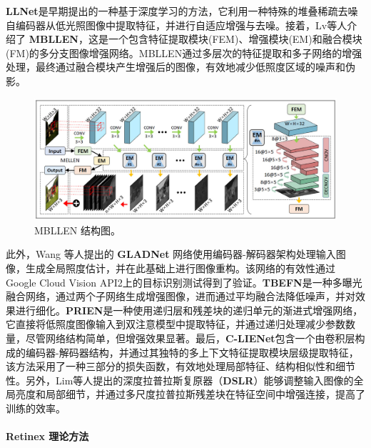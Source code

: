\documentclass[a4paper, 10pt]{article}
\begin{document}
	\textbf{LLNet}\cite{lore2017llnet}是早期提出的一种基于深度学习的方法，它利用一种特殊的堆叠稀疏去噪自编码器从低光照图像中提取特征，并进行自适应增强与去噪。接着，Lv等人\cite{lv2018mbllen}介绍了 \textbf{MBLLEN}，这是一个包含特征提取模块(FEM)、增强模块(EM)和融合模块(FM)的多分支图像增强网络。MBLLEN通过多层次的特征提取和多子网络的增强处理，最终通过融合模块产生增强后的图像，有效地减少低照度区域的噪声和伪影。
	
	\begin{figure}[htb]
		\centering 
		\includegraphics[width=\columnwidth]{picture/LLIE/MBLLEN/MBLLEN Architecture}
		\caption{
			\label{fig: MBLLEN Architecture} 
			MBLLEN 结构图。
		}
	\end{figure}
	
	此外，Wang 等人\cite{wang2018gladnet}提出的 \textbf{GLADNet} 网络使用编码器-解码器架构处理输入图像，生成全局照度估计，并在此基础上进行图像重构。该网络的有效性通过Google Cloud Vision API2上的目标识别测试得到了验证。\textbf{TBEFN}\cite{lu2020tbefn}是一种多曝光融合网络，通过两个子网络生成增强图像，进而通过平均融合法降低噪声，并对效果进行细化。\textbf{PRIEN}\cite{li2021low}是一种使用递归层和残差块的递归单元的渐进式增强网络，它直接将低照度图像输入到双注意模型中提取特征，并通过递归处理减少参数数量，尽管网络结构简单，但增强效果显著。最后，\textbf{C-LIENet}\cite{ravirathinam2021c}包含一个由卷积层构成的编码器-解码器结构，并通过其独特的多上下文特征提取模块层级提取特征，该方法采用了一种三部分的损失函数，有效地处理局部特征、结构相似性和细节性。另外，Lim等人\cite{lim2020dslr}提出的深度拉普拉斯复原器（\textbf{DSLR}）能够调整输入图像的全局亮度和局部细节，并通过多尺度拉普拉斯残差块在特征空间中增强连接，提高了训练的效率。
	
	\paragraph{Retinex 理论方法}
	
\end{document}
